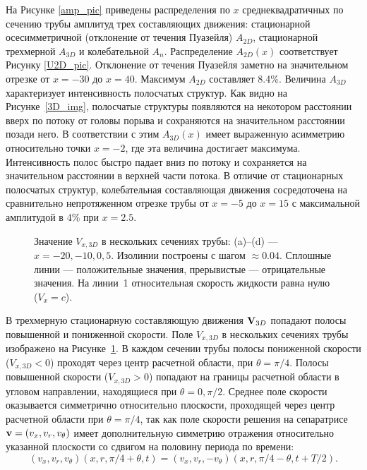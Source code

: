На Рисунке \ref{amp_pic} приведены распределения по $x$ среднеквадратичных по сечению трубы амплитуд трех составляющих движения: стационарной осесимметричной (отклонение от течения Пуазейля) $A_{2D}$, стационарной трехмерной $A_{3D}$ и колебательной $A_n$. Распределение $A_{2D}(x)$ соответствует Рисунку \ref{U2D_pic}. Отклонение от течения Пуазейля заметно на значительном отрезке от $x=-30$ до $x=40$. Максимум $A_{2D}$ составляет 8.4\%. Величина $A_{3D}$ характеризует интенсивность полосчатых структур. Как видно на Рисунке~\ref{3D_img}, полосчатые структуры появляются на некотором расстоянии вверх по потоку от головы порыва и сохраняются на значительном расстоянии позади него. В соответствии с этим $A_{3D}(x)$ имеет выраженную асимметрию относительно точки $x=-2$, где эта величина достигает максимума. Интенсивность полос быстро падает вниз по потоку и сохраняется на значительном расстоянии в верхней части потока. В отличие от стационарных полосчатых структур, колебательная составляющая движения сосредоточена на сравнительно непротяженном отрезке трубы от $x=-5$ до $x=15$ с максимальной амплитудой в 4\% при $x=2.5$.


\begin{figure}[h]
\caption{Значение $V_{x,3D}$ в нескольких сечениях трубы: (a)--(d) --- $x = -20, -10, 0, 5$. Изолинии построены с шагом $\approx 0.04$. Сплошные линии --- положительные значения, прерывистые --- отрицательные значения. На линии~1 относительная скорость жидкости равна нулю ($V_{x} = c$). }
\label{V3D_cs_pic}
\end{figure}


В трехмерную стационарную составляющую движения $\mathbf{V}_{3D}$ попадают полосы повышенной и пониженной скорости. Поле $V_{x,3D}$ в нескольких сечениях трубы изображено на Рисунке~\ref{V3D_cs_pic}. В каждом сечении трубы полосы пониженной скорости ($V_{x,3D} < 0$) проходят через центр расчетной области, при $\theta = \pi/4$. Полосы повышенной скорости ($V_{x,3D} > 0$) попадают на границы расчетной области в угловом направлении, находящиеся при $\theta = 0, \pi/2$. Среднее поле скорости оказывается симметрично относительно плоскости, проходящей через центр расчетной области при $\theta = \pi/4$, так как поле скорости решения на сепаратрисе $\mathbf{v} = (v_x, v_r, v_\theta)$ имеет дополнительную симметрию отражения относительно указанной плоскости со сдвигом на половину периода по времени:
\begin{equation}
(v_x, v_r, v_\theta)(x, r, \pi/4 + \theta, t) = (v_x, v_r, -v_\theta)(x, r, \pi/4 - \theta, t + T/2). 
\end{equation} 


